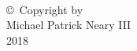 
\thispagestyle{empty}
\hbox{\ }

\vfill
\renewcommand{\baselinestretch}{1}
\small\normalsize

\vspace{-.65in}

\begin{center}
\large{\copyright \hbox{ }Copyright by\\
Michael Patrick Neary III  %
\\
2018}
\end{center}

\vfill
